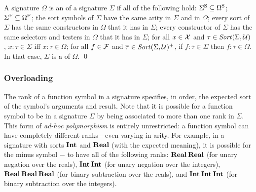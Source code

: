 \begin{definition}[Signature expansions] 

A signature $\Omega$ is an  of a signature $\Sigma$
if all of the following hold:
$\Sigma^\mathrm{S} \subseteq \Omega^\mathrm{S}$;
$\Sigma^\mathrm{F} \subseteq \Omega^\mathrm{F}$;
the sort symbols of $\Sigma$ have the same arity in $\Sigma$ and in $\Omega$;
every sort of $\Sigma$ has the same constructors in $\Omega$ that it has in $\Sigma$;
every constructor of $\Sigma$ has the same selectors and testers in $\Omega$ 
that it has in $\Sigma$;
for all $x \in \mathcal{X}$ and $\tau \in \mathit{Sort}(\Sigma, \mathcal{U})$,
$x{:}\tau \in \Sigma$ iff $x{:}\tau \in \Omega$;
for all $f \in \mathcal{F}$ and $\overline{\tau} \in \mathit{Sort}(\Sigma, \mathcal{U})^+$,
if $f{:}\overline{\tau} \in \Sigma$ then $f{:}\overline{\tau} \in \Omega$.
In that case, $\Sigma$ is a  of $\Omega$.
\qed
\end{definition}


\subsubsection{Overloading}
The rank of a function symbol in a signature specifies, in order,
the expected sort of the symbol's arguments and result.
Note that it is possible for a function symbol
to be  in a signature $\Sigma$
by being associated to more than one rank in $\Sigma$.
This form of \emph{ad-hoc polymorphism} is entirely unrestricted: 
a function symbol can have completely different ranks---even varying in arity. 
For example,
in a signature with sorts $\textbf{Int}$ and $\textbf{Real}$ (with the expected meaning),
it is possible for the minus symbol $-$ to have all of the following ranks:  
$\textbf{Real}\:\textbf{Real}$ (for unary negation over the reals),
$\textbf{Int}\:\textbf{Int}$ (for unary negation over the integers),
$\textbf{Real}\:\textbf{Real}\:\textbf{Real}$ (for binary subtraction over the reals),
and
$\textbf{Int}\:\textbf{Int}\:\textbf{Int}$ (for binary subtraction over the integers).


